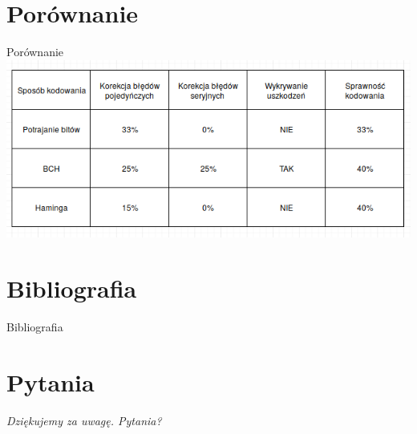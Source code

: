 \documentclass[12pt]{beamer}
\begin{document}
\section{Porównanie}
\begin{frame}{Porównanie}
\centering
\includegraphics[scale= 0.5]{image_source/porownanie.png}
		
\end{frame}

\section{Bibliografia}
\begin{frame}{Bibliografia}
	
\end{frame}

\section*{Pytania}
\begin{frame}
	\centering \Large\emph{Dziękujemy za uwagę. Pytania?}
\end{frame}
\end{document}

